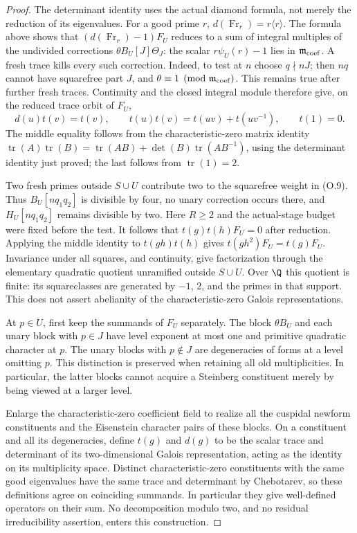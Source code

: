 \begin{proof}
The determinant identity uses the actual diamond formula, not merely
the reduction of its eigenvalues. For a good prime $r$,
$d(\operatorname{Fr}_r)=r\langle r\rangle$. The formula above shows
that $(d(\operatorname{Fr}_r)-1)F_U$ reduces to a sum of integral
multiples of the undivided corrections $\theta B_U[J]\Theta_J$:
the scalar $r\psi_U(r)-1$ lies in $\mathfrak m_{\rm coef}$.
A fresh trace kills every such correction. Indeed, to test at $n$
choose $q\nmid nJ$; then $nq$ cannot have squarefree part $J$, and
$\theta\equiv1\pmod{\mathfrak m_{\rm coef}}$. This remains true
after further fresh traces. Continuity and the closed integral
module therefore give, on the reduced trace orbit of $F_U$,
\[
 d(u)t(v)=t(v),\qquad
 t(u)t(v)=t(uv)+t(uv^{-1}),\qquad t(1)=0.
\]
The middle equality follows from the characteristic-zero matrix
identity
$\operatorname{tr}(A)\operatorname{tr}(B)
=\operatorname{tr}(AB)+\det(B)\operatorname{tr}(AB^{-1})$,
using the determinant identity just proved; the last follows from
$\operatorname{tr}(1)=2$.

Two fresh primes outside $S\cup U$ contribute two to the squarefree
weight in (O.9). Thus $B_U[nq_1q_2]$ is divisible by four, no unary
correction occurs there, and $H_U[nq_1q_2]$ remains divisible by two.
Here $R\ge2$ and the actual-stage budget were fixed before the test.
It follows that $t(g)t(h)F_U=0$ after reduction. Applying the middle
identity to $t(gh)t(h)$ gives $t(gh^2)F_U=t(g)F_U$.
Invariance under all squares, and continuity, give factorization
through the elementary quadratic quotient unramified outside
$S\cup U$. Over $\Q$ this quotient is finite: its squareclasses
are generated by $-1$, $2$, and the primes in that support.
This does not assert abelianity of the characteristic-zero
Galois representations.

At $p\in U$, first keep the summands of $F_U$ separately.
The block $\theta B_U$ and each unary block with $p\in J$ have
level exponent at most one and primitive quadratic character at $p$.
The unary blocks with $p\notin J$ are degeneracies of forms at a
level omitting $p$. This distinction is preserved when retaining all
old multiplicities. In particular, the latter blocks cannot acquire a
Steinberg constituent merely by being viewed at a larger level.

Enlarge the characteristic-zero coefficient field to realize all the
cuspidal newform constituents and the Eisenstein character pairs of
these blocks. On a constituent and all its degeneracies, define $t(g)$
and $d(g)$ to be the scalar trace and determinant of its two-dimensional
Galois representation, acting as the identity on its multiplicity
space. Distinct characteristic-zero constituents with the same good
eigenvalues have the same trace and determinant by Chebotarev, so
these definitions agree on coinciding summands. In particular they
give well-defined operators on their sum. No decomposition modulo
two, and no residual irreducibility assertion, enters this construction.


\end{proof}
